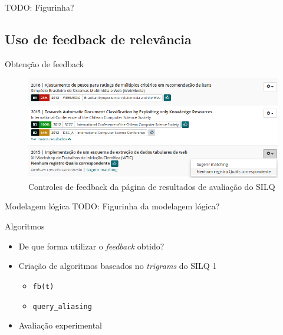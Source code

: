 \documentclass{beamer}
\begin{document}
\begin{frame}
  TODO: Figurinha?
\end{frame}

\subsection{Uso de feedback de relevância}

\begin{frame}{Obtenção de feedback}
  \begin{figure}
    \includegraphics[width=\textwidth]{figuras/feedbacks.png}
    \caption{Controles de feedback da página de resultados de avaliação do SILQ}
  \end{figure}
\end{frame}

\begin{frame}{Modelagem lógica}
  TODO: Figurinha da modelagem lógica?
\end{frame}

\begin{frame}{Algoritmos}
  \begin{itemize}
    \item De que forma utilizar o \textit{feedback} obtido?
    \item Criação de algoritmos baseados no \textit{trigrams} do SILQ 1
    \begin{itemize}
      \item \texttt{fb(t)}
      \item \texttt{query\_aliasing}
    \end{itemize}
    \item Avaliação experimental
  \end{itemize}
\end{frame}
\end{document}
